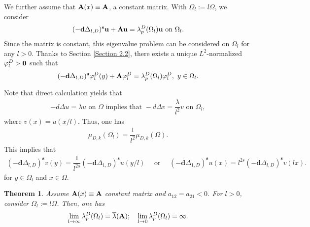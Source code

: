 \documentclass[a4paper,11pt]{amsart}
\newtheorem{theorem}{Theorem}
\theoremstyle{definition}
\def\O{\Omega}
\numberwithin{equation}{section}
\theoremstyle{definition}
\def\O{\Omega}
\begin{document}
%
%
We further assume that ${\bf A}(x)\equiv {\bf A}$, a constant matrix. With $\O_l:=l\O$, we consider
\begin{align*}
(-\textbf{d}\Delta_{l,D})^{\textbf{s}}\textbf{u} + {\bf Au}=\lambda^D_p(\O_l) {\bf u}\text{ on }\O_l.
\end{align*}
Since the matrix is constant, this eigenvalue problem can be considered on $\O_l$ for any $l>0$. Thanks to Section \ref{Section 2.2}, there exists a unique $L^2$-normalized  $\varphi_l^D>{\bf 0}$ such that
\begin{align*}
(-\textbf{d}\Delta_{l,D})^{\textbf{s}}\varphi_l^D(y) + {\bf A} \varphi_l^D=\lambda^D_p(\O_l)\varphi_l^D,~y\in\O_l.
\end{align*}

Note that direct calculation yields that
\begin{align*}
-d\Delta u= \lambda u \text{ on $\O$ implies that } -d\Delta v= \dfrac{\lambda}{l^2} v \text{ on }\O_l,
\end{align*}
where $v(x)=u(x/l)$. Thus, one has
\begin{align*}
\mu_{D,k}(\O_l) = \dfrac{1}{l^2} \mu_{D,k}(\O).
\end{align*}
This implies that
\begin{align*}
(-\textbf{d}\Delta_{l,D})^{\textbf{s}}v(y)=\dfrac{1}{l^{2s}} (-\textbf{d}\Delta_{1,D})^{\textbf{s}}u(y/l)\quad \text{ or }\quad(-\textbf{d}\Delta_{1,D})^{\textbf{s}}u(x)=l^{2s}(-\textbf{d}\Delta_{l,D})^{\textbf{s}}v( l x).
\end{align*}
for $y\in \O_l$ and $x\in \O$.


\begin{theorem}
Assume  ${\bf A}(x)\equiv {\bf A}$ constant matrix and $a_{12}=a_{21}<0$. For $l>0$, consider $\O_{l}:=l\O$. Then, one has
\begin{align*}
\lim_{l \rightarrow \infty}\lambda^D_p(\O_l)=\overline{\lambda}({\bf A});\quad \lim_{l \rightarrow 0}\lambda^D_p(\O_l)=\infty.
\end{align*}


\end{theorem}
\end{document}
